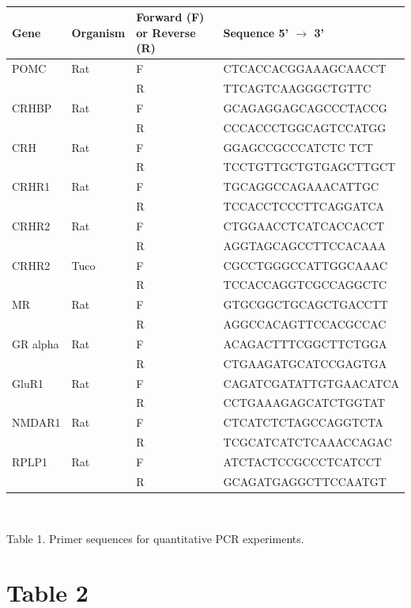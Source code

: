 \documentclass[10.5pt]{article}
\begin{document}
\textbf{\hypertarget{Table 1}{}} \\
\begin{center}
    \begin{tabular}{ | p{2cm} | p{2cm} | p{3cm}  | p{6cm} |}
    \hline
\textbf{Gene} 	&	 \textbf{Organism} 	&	 \textbf{Forward (F) or Reverse (R)} 	&	 \textbf{Sequence 5' $\rightarrow$ 3'} 	\\ \hline
POMC	&	Rat	&	F	&	CTCACCACGGAAAGCAACCT \\
	&		&	R	&	TTCAGTCAAGGGCTGTTC \\ \hline
CRHBP	&	Rat	&	F	&	GCAGAGGAGCAGCCCTACCG \\
	&		&	R	&	CCCACCCTGGCAGTCCATGG \\ \hline
CRH	&	Rat	&	F	&	GGAGCCGCCCATCTC TCT \\
	&		&	R	&	TCCTGTTGCTGTGAGCTTGCT \\ \hline
CRHR1	&	Rat	&	F	&	TGCAGGCCAGAAACATTGC \\ 
	&		&	R	&	TCCACCTCCCTTCAGGATCA \\ \hline
CRHR2	&	Rat	&	F	&	CTGGAACCTCATCACCACCT \\
	&		&	R	&	AGGTAGCAGCCTTCCACAAA \\ \hline
CRHR2	&	Tuco	&	F	&	CGCCTGGGCCATTGGCAAAC \\ 
	&		&	R	&	TCCACCAGGTCGCCAGGCTC \\ \hline
MR	&	Rat	&	F	&	GTGCGGCTGCAGCTGACCTT \\ 
	&		&	R	&	AGGCCACAGTTCCACGCCAC \\ \hline
GR alpha	&	Rat	&	F	&	ACAGACTTTCGGCTTCTGGA \\ 
	&		&	R	&	CTGAAGATGCATCCGAGTGA \\ \hline
GluR1	&	Rat	&	F	&	CAGATCGATATTGTGAACATCA \\
	&		&	R	&	CCTGAAAGAGCATCTGGTAT \\ \hline
NMDAR1	&	Rat	&	F	&	CTCATCTCTAGCCAGGTCTA \\ 
	&		&	R	&	TCGCATCATCTCAAACCAGAC \\ \hline
RPLP1	&	Rat	&	F	&	ATCTACTCCGCCCTCATCCT \\ 
	&		&	R	&	GCAGATGAGGCTTCCAATGT \\ \hline
 \end{tabular}
\\
\end{center}
\vspace{10mm}
\noindent
Table 1. Primer sequences for quantitative PCR experiments.  

\vspace{10mm}
\section*{Table 2}
\end{document}
